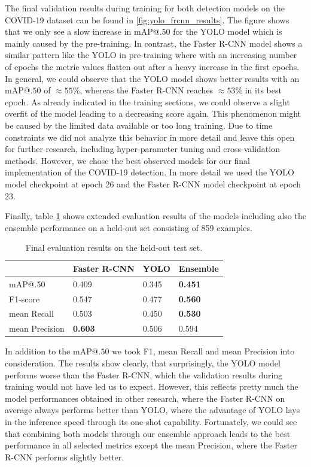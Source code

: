 The final validation results during training for both detection models on the COVID-19 dataset can be found in \ref{fig:yolo_frcnn_results}. The figure shows that we only see a slow increase in \ac{mAP}@$.50$ for the \ac{YOLO} model which is mainly caused by the pre-training. In contrast, the Faster \ac{R-CNN} model shows a similar pattern like the \ac{YOLO} in pre-training where with an increasing number of epochs the metric values flatten out after a heavy increase in the first epochs. In general, we could observe that the \ac{YOLO} model shows better results with an \ac{mAP}@$.50$ of $\approx 55\%$, whereas the Faster \ac{R-CNN} reaches $\approx 53\%$ in its best epoch. As already indicated in the training sections, we could observe a slight overfit of the model leading to a decreasing score again. This phenomenon might be caused by the limited data available or too long training. Due to time constraints we did not analyze this behavior in more detail and leave this open for further research, including hyper-parameter tuning and cross-validation methods.
However, we chose the best observed models for our final implementation of the COVID-19 detection. In more detail we used the \ac{YOLO} model checkpoint at epoch 26 and the Faster \ac{R-CNN} model checkpoint at epoch 23.

Finally, table \ref{table:final_results} shows extended evaluation results of the models including also the ensemble performance on a held-out set consisting of 859 examples. 
\begin{table}[h]
	\begin{tabular}{l|l|l|l}
		&    Faster R-CNN          &         YOLO             &  Ensemble \\ \hline
		mAP@.50			& \multicolumn{1}{l|}{0.409} & \multicolumn{1}{l|}{0.345} & \textbf{0.451}  \\
		F1-score		& \multicolumn{1}{l|}{0.547} & \multicolumn{1}{l|}{0.477} & \textbf{0.560} \\
		mean Recall		& \multicolumn{1}{l|}{0.503} & \multicolumn{1}{l|}{0.450} & \textbf{0.530} \\
		mean Precision	& \multicolumn{1}{l|}{\textbf{0.603}} & \multicolumn{1}{l|}{0.506} & 0.594 \\
	\end{tabular}
	\centering
	\caption{Final evaluation results on the held-out test set.}
	\label{table:final_results}
\end{table}

In addition to the \ac{mAP}@$.50$ we took F1, mean Recall and mean Precision into consideration. The results show clearly, that surprisingly, the \ac{YOLO} model performs worse than the Faster \ac{R-CNN}, which the validation results during training would not have led us to expect. However, this reflects pretty much the model performances obtained in other research, where the Faster \ac{R-CNN} on average always performs better than \ac{YOLO}, where the advantage of \ac{YOLO} lays in the inference speed through its one-shot capability. Fortunately, we could see that combining both models through our ensemble approach leads to the best performance in all selected metrics except the mean Precision, where the Faster \ac{R-CNN} performs slightly better.

